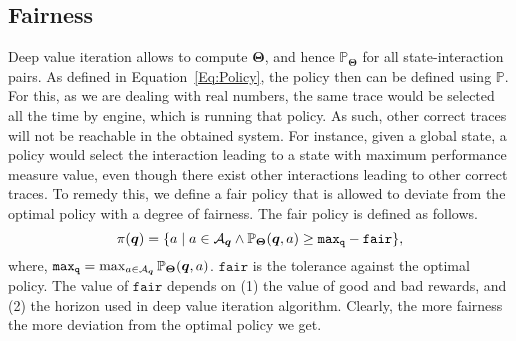 \subsection{Fairness}
Deep value iteration allows to compute $\bm{\Theta}$, and hence $\mathbb{P}_{\bm{\Theta}}$ for all state-interaction pairs. As defined in Equation~\ref{Eq:Policy}, the policy then can be defined using $\mathbb{P}$. For this, as we are dealing with real numbers, the same trace would be selected all the time by engine, which is running that policy. As such, other correct traces will not be reachable in the obtained system. For instance, given a global state, a policy would select the interaction leading to a state with maximum performance measure value, even though there exist other interactions leading to other correct traces. To remedy this, we define a fair policy that is allowed to deviate from the optimal policy with a degree of fairness.  The fair policy is defined as follows. 
\vspace*{-0.2cm}
\begin{equation}
\label{Eq:Policy-fair}
\pi(\bm{q}) = \{a \mid a \in {\cal A}_{\bm{q}} \wedge \mathbb{P}_{\bm{\Theta}}(\bm{q}, a) \geq \mathtt{max_{\bm{q}}} - \mathtt{fair}\},
\end{equation}
where, $\mathtt{max_{\bm{q}}} = \max_{a \in {\cal A}_{\bm{q}}}\mathbb{P}_{\bm{\Theta}}(\bm{q}, a)$.  $\mathtt{fair}$ is the tolerance against the optimal policy. The value of $\mathtt{fair}$ depends on (1) the value of good and bad rewards, and (2) the  horizon used in deep value iteration algorithm. Clearly, the more fairness the more deviation from the optimal policy we get. 